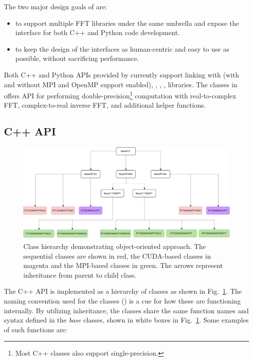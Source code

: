 The two major design goals of  are:
\begin{itemize}
 \item to support multiple FFT libraries under the same umbrella and expose the
 interface for both C++ and Python code development.
 \item to keep the design of the interfaces as human-centric and easy to use as
 possible, without sacrificing performance.
\end{itemize}

Both C++ and Python APIs provided by  currently support linking
with  (with and without MPI and OpenMP support enabled),
, , ,  libraries. The
classes in  offers API for performing
double-precision\footnote{Most C++ classes also support single-precision.}
computation with real-to-complex FFT, complex-to-real inverse FFT, and additional
helper functions.

\subsection{C++ API}

\begin{figure}[htp]
  \centering
  \includegraphics[width=\linewidth]{Pyfig/fig_classes}
  \caption{Class hierarchy demonstrating object-oriented approach. The
    sequential classes are shown in red, the CUDA-based classes in magenta and
    the MPI-based classes in green. The arrows represent inheritance from
    parent to child class.
  }\label{fig:classes}
\end{figure}

The C++ API is implemented as a hierarchy of classes as shown in
Fig.~\ref{fig:classes}.
%
The naming convention used for the classes () is a cue for how these are functioning internally.
%
By utilizing inheritance, the classes share the same function names and syntax
defined in the \emph{base} classes, shown in white boxes in
Fig.~\ref{fig:classes}. Some examples of such functions are:

